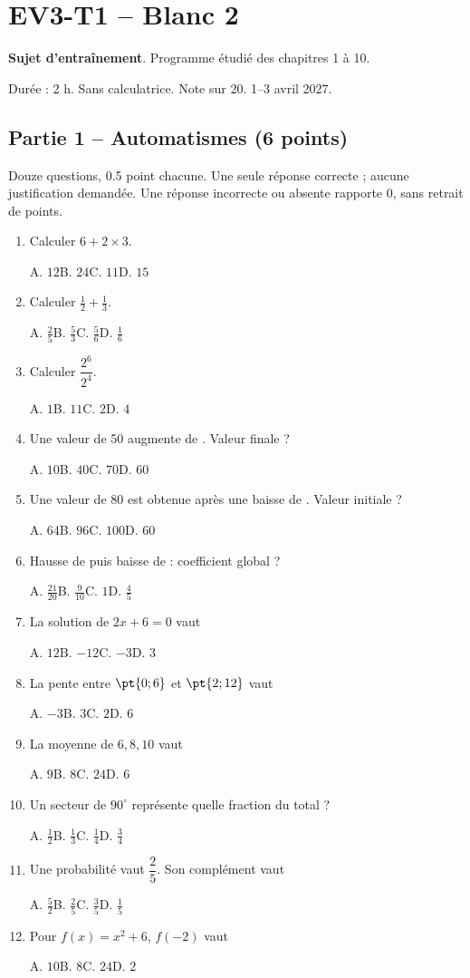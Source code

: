 \mxnewpage\section*{EV3-T1 -- Blanc 2}\label{EV3-T1}
\textbf{Sujet d’entraînement}. Programme étudié des chapitres 1 à 10.\par Durée : 2 h. Sans calculatrice. Note sur 20. 1–3 avril 2027.
\subsection*{Partie 1 -- Automatismes (6 points)}
Douze questions, \num{0,5} point chacune. Une seule réponse correcte ; aucune justification demandée. Une réponse incorrecte ou absente rapporte 0, sans retrait de points.
\begin{enumerate}
\item Calculer $6+2\times3$.\par A. $12$\quad B. $24$\quad C. $11$\quad D. $15$
\item Calculer $\frac12+\frac13$.\par A. $\frac{2}{5}$\quad B. $\frac{5}{3}$\quad C. $\frac{5}{6}$\quad D. $\frac{1}{6}$
\item Calculer $\dfrac{2^6}{2^{4}}$.\par A. $1$\quad B. $11$\quad C. $2$\quad D. $4$
\item Une valeur de 50 augmente de . Valeur finale ?\par A. $10$\quad B. $40$\quad C. $70$\quad D. $60$
\item Une valeur de 80 est obtenue après une baisse de . Valeur initiale ?\par A. $64$\quad B. $96$\quad C. $100$\quad D. $60$
\item Hausse de  puis baisse de  : coefficient global ?\par A. $\frac{21}{20}$\quad B. $\frac{9}{10}$\quad C. $1$\quad D. $\frac{4}{5}$
\item La solution de $2x+6=0$ vaut\par A. $12$\quad B. $-12$\quad C. $-3$\quad D. $3$
\item La pente entre $\pt{0;6}$ et $\pt{2;12}$ vaut\par A. $-3$\quad B. $3$\quad C. $2$\quad D. $6$
\item La moyenne de $6, 8, 10$ vaut\par A. $9$\quad B. $8$\quad C. $24$\quad D. $6$
\item Un secteur de $90^\circ$ représente quelle fraction du total ?\par A. $\frac{1}{2}$\quad B. $\frac{1}{3}$\quad C. $\frac{1}{4}$\quad D. $\frac{3}{4}$
\item Une probabilité vaut $\dfrac{2}{5}$. Son complément vaut\par A. $\frac{5}{2}$\quad B. $\frac{2}{5}$\quad C. $\frac{3}{5}$\quad D. $\frac{1}{5}$
\item Pour $f(x)=x^2+6$, $f(-2)$ vaut\par A. $10$\quad B. $8$\quad C. $24$\quad D. $2$
\end{enumerate}
